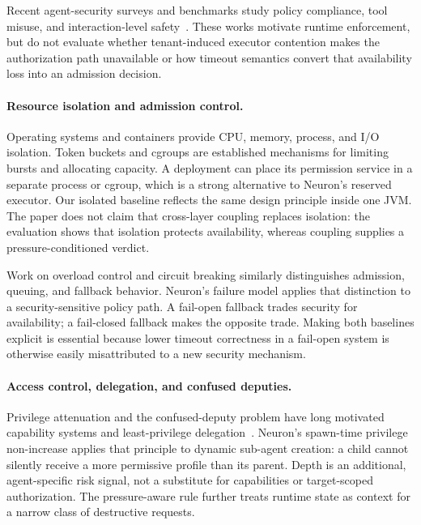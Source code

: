 Recent agent-security surveys and benchmarks study policy compliance, tool
misuse, and interaction-level safety~\cite{wang2024policy,ruan2024toolemu,zhang2024agentsafetybench,struppek2024agent}. These works motivate runtime
enforcement, but do not evaluate whether tenant-induced executor contention
makes the authorization path unavailable or how timeout semantics convert
that availability loss into an admission decision.

\paragraph{Resource isolation and admission control.}
Operating systems and containers provide CPU, memory, process, and I/O
isolation. Token buckets and cgroups are established mechanisms for limiting
bursts and allocating capacity. A deployment can place its permission
service in a separate process or cgroup, which is a strong alternative to
Neuron's reserved executor. Our isolated baseline reflects the same design
principle inside one JVM. The paper does not claim that cross-layer coupling
replaces isolation: the evaluation shows that isolation protects
availability, whereas coupling supplies a pressure-conditioned verdict.

Work on overload control and circuit breaking similarly distinguishes
admission, queuing, and fallback behavior. Neuron's failure model applies
that distinction to a security-sensitive policy path. A fail-open fallback
trades security for availability; a fail-closed fallback makes the opposite
trade. Making both baselines explicit is essential because lower timeout
correctness in a fail-open system is otherwise easily misattributed to a new
security mechanism.

\paragraph{Access control, delegation, and confused deputies.}
Privilege attenuation and the confused-deputy problem have long motivated
capability systems and least-privilege delegation~\cite{hardy1988confused}.
Neuron's spawn-time privilege non-increase applies that principle to dynamic
sub-agent creation: a child cannot silently receive a more permissive
profile than its parent. Depth is an additional, agent-specific risk signal,
not a substitute for capabilities or target-scoped authorization. The
pressure-aware rule further treats runtime state as context for a narrow
class of destructive requests.


